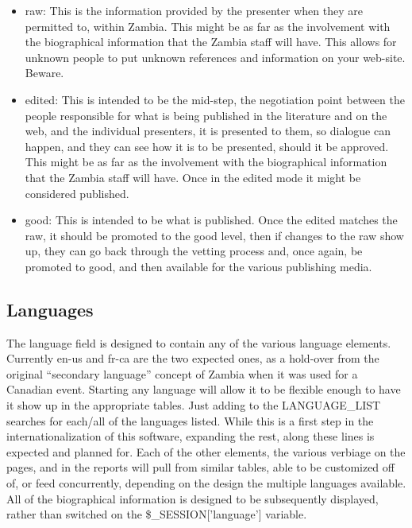 \documentclass[tablesignature]{scrartcl}
\begin{document}
\begin{itemize}
\item raw: This is the information provided by the presenter when they
     are permitted to, within Zambia.  This might be as far as the
     involvement with the biographical information that the Zambia
     staff will have.  This allows for unknown people to put unknown
     references and information on your web-site.  Beware.
\item edited: This is intended to be the mid-step, the negotiation
     point between the people responsible for what is being published
     in the literature and on the web, and the individual presenters,
     it is presented to them, so dialogue can happen, and they can see
     how it is to be presented, should it be approved.  This might be
     as far as the involvement with the biographical information that
     the Zambia staff will have.  Once in the edited mode it might be
     considered published.
\item good: This is intended to be what is published.  Once the edited
     matches the raw, it should be promoted to the good level, then if
     changes to the raw show up, they can go back through the vetting
     process and, once again, be promoted to good, and then available
     for the various publishing media.
\end{itemize}
\subsection{Languages}
\label{sec-2_3}


   The language field is designed to contain any of the various
   language elements.  Currently en-us and fr-ca are the two expected
   ones, as a hold-over from the original ``secondary language'' concept
   of Zambia when it was used for a Canadian event.  Starting any
   language will allow it to be flexible enough to have it show up in
   the appropriate tables.  Just adding to the LANGUAGE\_{}LIST searches
   for each/all of the languages listed.  While this is a first step
   in the internationalization of this software, expanding the rest,
   along these lines is expected and planned for.  Each of the other
   elements, the various verbiage on the pages, and in the reports
   will pull from similar tables, able to be customized off of, or
   feed concurrently, depending on the design the multiple languages
   available.  All of the biographical information is designed to be
   subsequently displayed, rather than switched on the
   \$\_{}SESSION['language'] variable.
\end{document}
